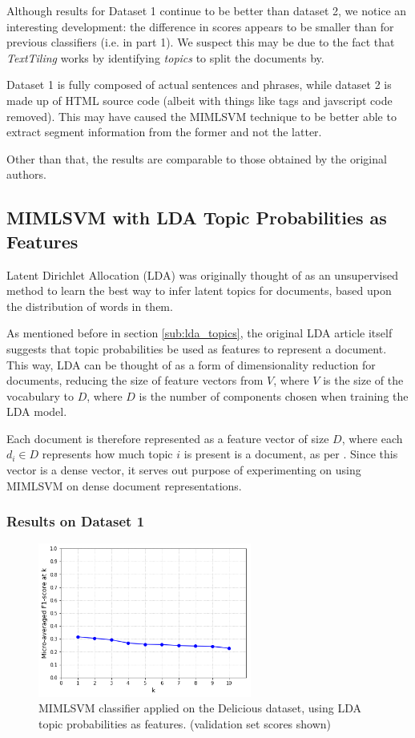 Although results for Dataset 1 continue to be better than dataset 2, we notice an interesting development: the difference in scores appears to be smaller than for previous classifiers (i.e. in part 1). We suspect this may be due to the fact that \textit{TextTiling} works by identifying \textit{topics} to split the documents by. 

Dataset 1 is fully composed of actual sentences and phrases, while dataset 2 is made up of HTML source code (albeit with things like tags and javscript code removed). This may have caused the MIMLSVM technique to be better able to extract segment information from the former and not the latter.

Other than that, the results are comparable to those obtained by the original authors.

\subsection{MIMLSVM with LDA Topic Probabilities as Features}

Latent Dirichlet Allocation (LDA) \cite{blei_etal_2003} was originally thought of as an unsupervised method to learn the best way to infer latent topics for documents, based upon the distribution of words in them. 

As mentioned before in section \ref{sub:lda_topics}, the original LDA article itself suggests that topic probabilities be used as features to represent a document. This way, LDA can be thought of as a form of dimensionality reduction for documents, reducing the size of feature vectors from $V$, where $V$ is the size of the vocabulary to $D$, where $D$ is the number of components chosen when training the LDA model.

Each document is therefore represented as a feature vector of size $D$, where each $d_i \in D$ represents how much topic $i$ is present is a document, as per \cite{blei_etal_2003}. Since this vector is a dense vector, it serves out purpose of experimenting on using MIMLSVM on dense document representations.

\subsubsection{Results on Dataset 1}

\begin{figure}[H]
    \centering
    \includegraphics[width=7cm]{chapters/05_experiments/images/delicious-mimlsvm-lda.png}
    \caption{MIMLSVM classifier applied on the Delicious dataset, using LDA topic probabilities as features. (validation set scores shown)}
    \label{fig:mimlsvm_delicious_lda}
\end{figure}

